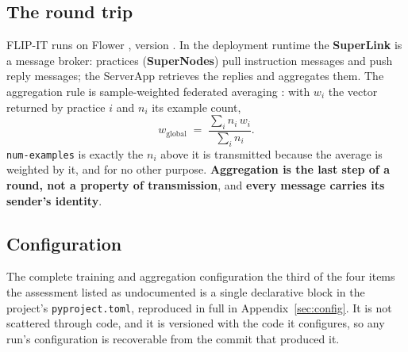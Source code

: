 \subsection{The round trip}

FLIP-IT runs on Flower \cite{beutel2020flower}, version \FlwrVersion{}. In the deployment runtime the
\textbf{SuperLink} is a message broker: practices (\textbf{SuperNodes}) pull instruction messages and
push reply messages; the ServerApp retrieves the replies and aggregates them. The aggregation rule
is sample-weighted federated averaging \cite{mcmahan2017fedavg}: with $w_i$ the vector returned by
practice $i$ and $n_i$ its example count,
\[
  w_{\text{global}} \;=\; \frac{\sum_i n_i\, w_i}{\sum_i n_i}.
\]
\texttt{num-examples} is exactly the $n_i$ above it is transmitted because the average is
weighted by it, and for no other purpose. \textbf{Aggregation is the last step of a round, not a
property of transmission}, and \textbf{every message carries its sender's identity}.

\subsection{Configuration}

The complete training and aggregation configuration the third of the four items the assessment
listed as undocumented is a single declarative block in the project's \texttt{pyproject.toml},
reproduced in full in Appendix~\ref{sec:config}. It is not scattered through code, and it is
versioned with the code it configures, so any run's configuration is recoverable from the commit
that produced it.
